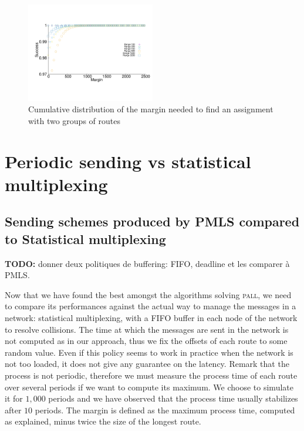 \documentclass[10pt, conference, letterpaper]{IEEEtran}
\newcommand\pall{\textsc{pall}\xspace}
\begin{document}
                \begin{figure}
       \begin{center}
      \includegraphics[width = 0.5\textwidth]{departs_distrib2Grp.pdf}
      \end{center}
    \caption{Cumulative distribution of the margin needed to find an assignment with two groups of routes}
      \label{fig:2grp}   
     \end{figure}    
     
     

\section{Periodic sending vs statistical multiplexing}\label{sec:comparison}

     \subsection{Sending schemes produced by PMLS compared to Statistical multiplexing}

     \textbf{TODO:} donner deux politiques de buffering: FIFO, deadline et les comparer à PMLS.


     Now that we have found the best amongst the algorithms solving \pall, we need to compare its performances against the actual way to manage the messages in a network:  statistical multiplexing, with a FIFO buffer in each node of the network to resolve collisions. The time at which the messages are sent in the network is not computed as in our approach, thus we fix the offsets of each route to some random value.
     Even if this policy seems to work in practice when the network is not too loaded, it does not give any guarantee on the latency. Remark that the process is not periodic, therefore we must measure the process time of each route over several periods if we want to compute its maximum. We choose to simulate it for $1,000$ periods and we have observed that the process time usually stabilizes after $10$ periods. The margin is defined as the maximum process time, computed as explained, minus twice the size of the longest route. 
	    
\end{document}
